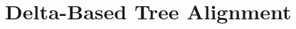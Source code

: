 \documentclass[preprint,numbers]{sigplanconf}
\newcommand{\Conid}[1]{\mathit{#1}}
\newcommand{\Varid}[1]{\mathit{#1}}
\def\resethooks{%
  \global\let\SaveRestoreHook\empty
  \global\let\ColumnHook\empty}
\newlength{\blanklineskip}
\newcommand{\hsindent}[1]{\quad}%
\begin{document}

\section{Delta-Based Tree Alignment}
\end{document}
